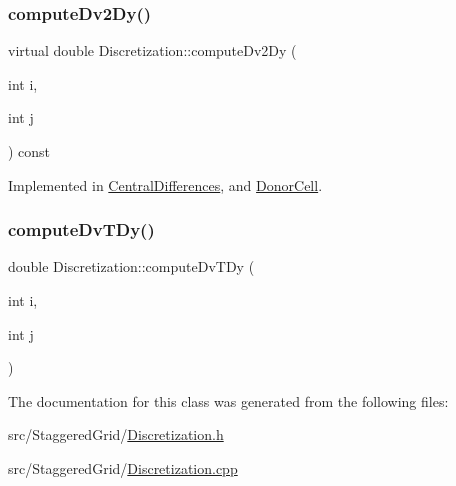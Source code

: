 \subsubsection{\texorpdfstring{computeDv2Dy()}{computeDv2Dy()}}
{\footnotesize\ttfamily virtual double Discretization\+::compute\+Dv2\+Dy (\begin{DoxyParamCaption}\item[{int}]{i,  }\item[{int}]{j }\end{DoxyParamCaption}) const\hspace{0.3cm}{\ttfamily [pure virtual]}}



Implemented in \mbox{\hyperlink{classCentralDifferences_a1fc0c5d01fcc12943e1f04e1b2548c92}{Central\+Differences}}, and \mbox{\hyperlink{classDonorCell_a7b3026b85f60709b52742cb672af81c1}{Donor\+Cell}}.

\mbox{\label{classDiscretization_a992543b930d6b4857c219adb8d41acf6}} 
\subsubsection{\texorpdfstring{computeDvTDy()}{computeDvTDy()}}
{\footnotesize\ttfamily double Discretization\+::compute\+Dv\+T\+Dy (\begin{DoxyParamCaption}\item[{int}]{i,  }\item[{int}]{j }\end{DoxyParamCaption})}



The documentation for this class was generated from the following files\+:\begin{DoxyCompactItemize}
\item 
src/\+Staggered\+Grid/\mbox{\hyperlink{Discretization_8h}{Discretization.\+h}}\item 
src/\+Staggered\+Grid/\mbox{\hyperlink{Discretization_8cpp}{Discretization.\+cpp}}\end{DoxyCompactItemize}
